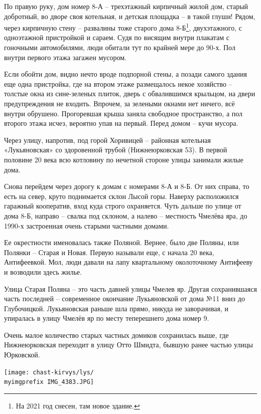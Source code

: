 По правую руку, дом номер 8-А – трехэтажный кирпичный жилой дом, старый добротный, во дворе своя котельная, и детская площадка – в такой глуши! Рядом, через кирпичную стену – развалины тоже старого дома 8-Б\footnote{На 2021 год снесен, там новое здание.}, двухэтажного, с одноэтажной пристройкой и сараем. Судя по висящим внутри плакатам с гоночными автомобилями, люди обитали тут по крайней мере до 90-х. Пол внутри первого этажа загажен мусором. 

Если обойти дом, видно нечто вроде подпорной стены, а позади самого здания еще одна пристройка, где на втором этаже размещалось некое хозяйство – толстые окна из сине-зеленых плиток, дверь с обвалившимся крыльцом, на двери предупреждения не входить. Впрочем, за зелеными окнами нет ничего, всё внутри обрушено. Прогоревшая крыша заняла свободное пространство, а пол второго этажа исчез, вероятно упав на первый. Перед домом – кучи мусора.

Через улицу, напротив, под горой Хоривицей – районная котельная «Лукьяновская» со здоровенной трубой (Нижнеюрковская 53). В первой половине 20 века всю котловину по нечетной стороне улицы занимали жилые дома.

Снова перейдем через дорогу к домам с номерами 8-А и 8-Б. От них справа, то есть на север, круто поднимается склон Лысой горы. Наверху расположился гаражный кооператив, вход куда строго охраняется. Чуть дальше по улице от дома 8-Б, направо – свалка под склоном, а налево – местность Чмелёва яра, до 1990-х застроенная очень старыми частными домами.

Ее окрестности именовалась также Поляной. Вернее, было две Поляны, или Полянки – Старая и Новая. Первую называли еще, с начала 20 века, Антифеевкой. Мол, люди давали на лапу квартальному околоточному Антифееву и возводили здесь жилье.

Улица Старая Поляна – это часть давней улицы Чмелев яр. Другая сохранившаяся часть последней – современное окончание Лукьяновской от дома №11 вниз до Глубочицкой. Лукьяновская раньше шла прямо, никуда не заворачивая, и упиралась в улицу Чмелёв яр по месту теперешнего дома номер 9.

Очень малое количество старых частных домиков сохранилась выше, где Нижнеюрковская переходит в улицу Отто Шмидта, бывшую ранее частью улицы Юрковской. 

\newpage
\vspace*{\fill}
\begin{center}
\texttt{[image: chast-kirvys/lys/\\myimgprefix IMG\_4383.JPG]}
\end{center} 

